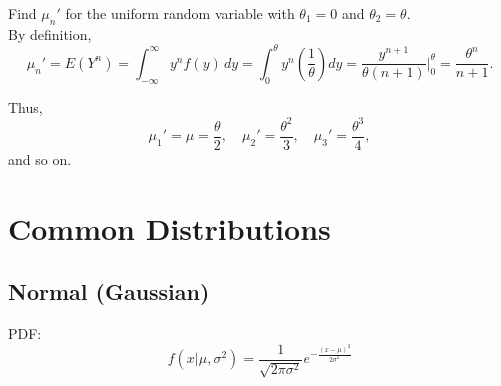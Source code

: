 \documentclass[DIV=14,titlepage=false]{scrreprt}
\begin{document}
\begin{example}
  Find \( \mu_n' \) for the uniform random variable with \( \theta_1 = 0 \) and \( \theta_2 = \theta \).
\\
  By definition,
  \[
  \mu_n' = E(Y^n) = \int_{-\infty}^{\infty} y^n f(y) \, dy = \int_{0}^{\theta} y^n \left( \frac{1}{\theta} \right) dy = \frac{y^{n+1}}{\theta(n + 1)} \Bigg|_0^{\theta} = \frac{\theta^n}{n + 1}.
  \]

  Thus,
  \[
  \mu_1' = \mu = \frac{\theta}{2}, \quad \mu_2' = \frac{\theta^2}{3}, \quad \mu_3' = \frac{\theta^3}{4},
  \]
  and so on.
\end{example}
\section{Common Distributions}

\subsection*{Normal (Gaussian)}
PDF: \[ \displaystyle f(x|\mu,\sigma^2) = \frac{1}{\sqrt{2\pi\sigma^2}} e^{-\frac{(x-\mu)^2}{2\sigma^2}} \]
\vspace{10pt}
\end{document}

